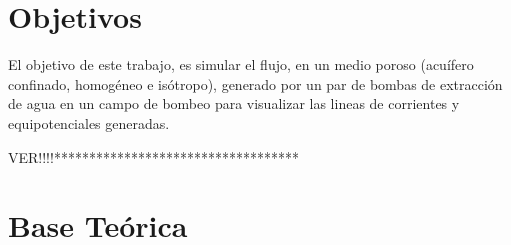 \documentclass[10pt,a4paper,final]{article}
\begin{document}
\section{Objetivos}
El objetivo de este trabajo, es simular el flujo, en un medio poroso (acuífero confinado, homogéneo e isótropo), generado por un par de bombas de extracción de agua en un campo de bombeo para visualizar las lineas de corrientes y equipotenciales generadas. \begin{Large}
VER!!!!***********************************
\end{Large}
\section{Base Teórica}
\end{document}
